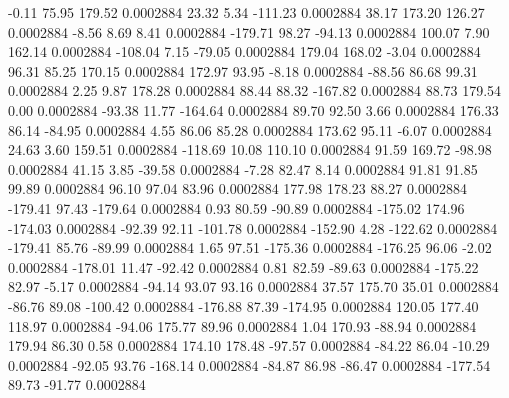        -0.11       75.95      179.52     0.0002884
       23.32        5.34     -111.23     0.0002884
       38.17      173.20      126.27     0.0002884
       -8.56        8.69        8.41     0.0002884
     -179.71       98.27      -94.13     0.0002884
      100.07        7.90      162.14     0.0002884
     -108.04        7.15      -79.05     0.0002884
      179.04      168.02       -3.04     0.0002884
       96.31       85.25      170.15     0.0002884
      172.97       93.95       -8.18     0.0002884
      -88.56       86.68       99.31     0.0002884
        2.25        9.87      178.28     0.0002884
       88.44       88.32     -167.82     0.0002884
       88.73      179.54        0.00     0.0002884
      -93.38       11.77     -164.64     0.0002884
       89.70       92.50        3.66     0.0002884
      176.33       86.14      -84.95     0.0002884
        4.55       86.06       85.28     0.0002884
      173.62       95.11       -6.07     0.0002884
       24.63        3.60      159.51     0.0002884
     -118.69       10.08      110.10     0.0002884
       91.59      169.72      -98.98     0.0002884
       41.15        3.85      -39.58     0.0002884
       -7.28       82.47        8.14     0.0002884
       91.81       91.85       99.89     0.0002884
       96.10       97.04       83.96     0.0002884
      177.98      178.23       88.27     0.0002884
     -179.41       97.43     -179.64     0.0002884
        0.93       80.59      -90.89     0.0002884
     -175.02      174.96     -174.03     0.0002884
      -92.39       92.11     -101.78     0.0002884
     -152.90        4.28     -122.62     0.0002884
     -179.41       85.76      -89.99     0.0002884
        1.65       97.51     -175.36     0.0002884
     -176.25       96.06       -2.02     0.0002884
     -178.01       11.47      -92.42     0.0002884
        0.81       82.59      -89.63     0.0002884
     -175.22       82.97       -5.17     0.0002884
      -94.14       93.07       93.16     0.0002884
       37.57      175.70       35.01     0.0002884
      -86.76       89.08     -100.42     0.0002884
     -176.88       87.39     -174.95     0.0002884
      120.05      177.40      118.97     0.0002884
      -94.06      175.77       89.96     0.0002884
        1.04      170.93      -88.94     0.0002884
      179.94       86.30        0.58     0.0002884
      174.10      178.48      -97.57     0.0002884
      -84.22       86.04      -10.29     0.0002884
      -92.05       93.76     -168.14     0.0002884
      -84.87       86.98      -86.47     0.0002884
     -177.54       89.73      -91.77     0.0002884
